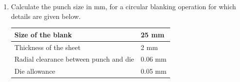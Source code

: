 \documentclass[journal,12pt,onecolumn]{IEEEtran}
\begin{document}
\begin{enumerate}[resume]
          \begin{enumerate}
          \end{enumerate}

    \item Calculate the punch size in mm, for a circular blanking operation for which details are given below.

          \begin{table}[H]
              \centering
              \begin{tabular}{|l|l|}
                  \hline
                  Size of the blank                      & 25 mm   \\
                  \hline
                  Thickness of the sheet                 & 2 mm    \\
                  \hline
                  Radial clearance between punch and die & 0.06 mm \\
                  \hline
                  Die allowance                          & 0.05 mm \\
                  \hline
              \end{tabular}
          \end{table}

          \begin{enumerate}
          \end{enumerate}


\end{enumerate}
\end{document}
